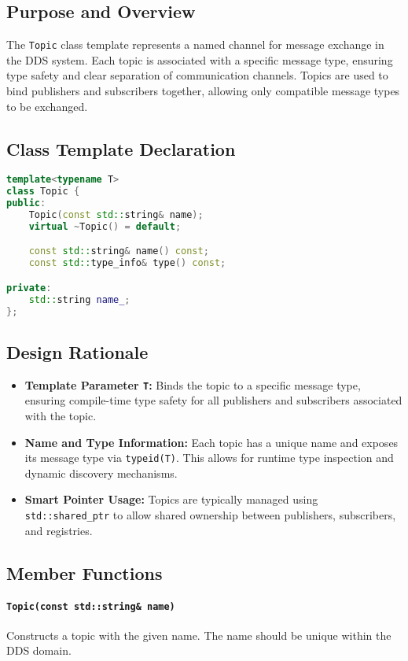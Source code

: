 \documentclass[12pt]{report}
\begin{document}
\subsection{Purpose and Overview}
The \texttt{Topic} class template represents a named channel for message exchange in the DDS system. Each topic is associated with a specific message type, ensuring type safety and clear separation of communication channels. Topics are used to bind publishers and subscribers together, allowing only compatible message types to be exchanged.

\subsection{Class Template Declaration}
\begin{lstlisting}[language=C++]
template<typename T>
class Topic {
public:
    Topic(const std::string& name);
    virtual ~Topic() = default;

    const std::string& name() const;
    const std::type_info& type() const;

private:
    std::string name_;
};
\end{lstlisting}

\subsection{Design Rationale}
\begin{itemize}
    \item \textbf{Template Parameter \texttt{T}:} Binds the topic to a specific message type, ensuring compile-time type safety for all publishers and subscribers associated with the topic.
    \item \textbf{Name and Type Information:} Each topic has a unique name and exposes its message type via \texttt{typeid(T)}. This allows for runtime type inspection and dynamic discovery mechanisms.
    \item \textbf{Smart Pointer Usage:} Topics are typically managed using \texttt{std::shared\_ptr} to allow shared ownership between publishers, subscribers, and registries.
\end{itemize}

\subsection{Member Functions}
\paragraph{\texttt{Topic(const std::string\& name)}}
Constructs a topic with the given name. The name should be unique within the DDS domain.
\end{document}
